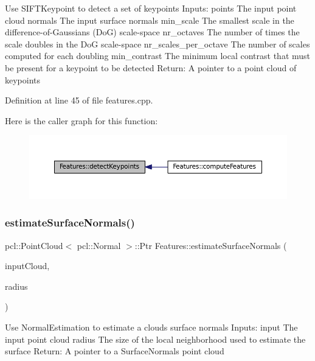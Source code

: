 Use S\+I\+F\+T\+Keypoint to detect a set of keypoints Inputs\+: points The input point cloud normals The input surface normals min\+\_\+scale The smallest scale in the difference-\/of-\/\+Gaussians (DoG) scale-\/space nr\+\_\+octaves The number of times the scale doubles in the DoG scale-\/space nr\+\_\+scales\+\_\+per\+\_\+octave The number of scales computed for each doubling min\+\_\+contrast The minimum local contrast that must be present for a keypoint to be detected Return\+: A pointer to a point cloud of keypoints 

Definition at line 45 of file features.\+cpp.

Here is the caller graph for this function\+:
\nopagebreak
\begin{figure}[H]
\begin{center}
\leavevmode
\includegraphics[width=350pt]{class_features_a5c6f5430e675a9216da80875e700f32e_icgraph}
\end{center}
\end{figure}
\hypertarget{class_features_a925cf73afb0607d0fe74a47347ec670d}{}\label{class_features_a925cf73afb0607d0fe74a47347ec670d} 
\subsubsection{\texorpdfstring{estimate\+Surface\+Normals()}{estimateSurfaceNormals()}}
{\footnotesize\ttfamily pcl\+::\+Point\+Cloud$<$ pcl\+::\+Normal $>$\+::Ptr Features\+::estimate\+Surface\+Normals (\begin{DoxyParamCaption}\item[{const pcl\+::\+Point\+Cloud$<$ pcl\+::\+Point\+X\+Y\+Z\+R\+GB $>$\+::Ptr \&}]{input\+Cloud,  }\item[{float}]{radius }\end{DoxyParamCaption})}

Use Normal\+Estimation to estimate a cloud\textquotesingle{}s surface normals Inputs\+: input The input point cloud radius The size of the local neighborhood used to estimate the surface Return\+: A pointer to a Surface\+Normals point cloud 

